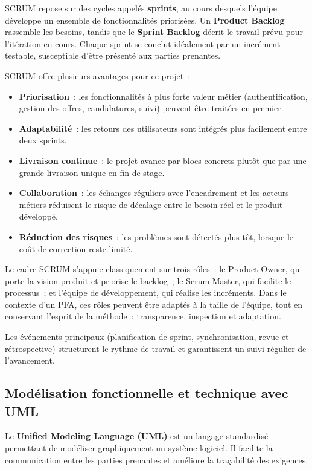 SCRUM repose sur des cycles appelés \textbf{sprints}, au cours desquels
l'équipe développe un ensemble de fonctionnalités priorisées. Un
\textbf{Product Backlog} rassemble les besoins, tandis que le
\textbf{Sprint Backlog} décrit le travail prévu pour l'itération en cours.
Chaque sprint se conclut idéalement par un incrément testable, susceptible
d'être présenté aux parties prenantes.

SCRUM offre plusieurs avantages pour ce projet~:
\begin{itemize}
  \item \textbf{Priorisation}~: les fonctionnalités à plus forte valeur métier
        (authentification, gestion des offres, candidatures, suivi) peuvent
        être traitées en premier.
  \item \textbf{Adaptabilité}~: les retours des utilisateurs sont intégrés
        plus facilement entre deux sprints.
  \item \textbf{Livraison continue}~: le projet avance par blocs concrets
        plutôt que par une grande livraison unique en fin de stage.
  \item \textbf{Collaboration}~: les échanges réguliers avec l'encadrement
        et les acteurs métiers réduisent le risque de décalage entre le besoin
        réel et le produit développé.
  \item \textbf{Réduction des risques}~: les problèmes sont détectés plus tôt,
        lorsque le coût de correction reste limité.
\end{itemize}

Le cadre SCRUM s'appuie classiquement sur trois rôles~: le Product Owner, qui
porte la vision produit et priorise le backlog~; le Scrum Master, qui facilite
le processus~; et l'équipe de développement, qui réalise les incréments. Dans
le contexte d'un PFA, ces rôles peuvent être adaptés à la taille de l'équipe,
tout en conservant l'esprit de la méthode~: transparence, inspection et
adaptation.

Les événements principaux (planification de sprint, synchronisation,
revue et rétrospective) structurent le rythme de travail et garantissent un
suivi régulier de l'avancement.


\subsection{Modélisation fonctionnelle et technique avec UML}

Le \textbf{Unified Modeling Language (UML)} est un langage standardisé permettant
de modéliser graphiquement un système logiciel. Il facilite la communication
entre les parties prenantes et améliore la traçabilité des exigences.

